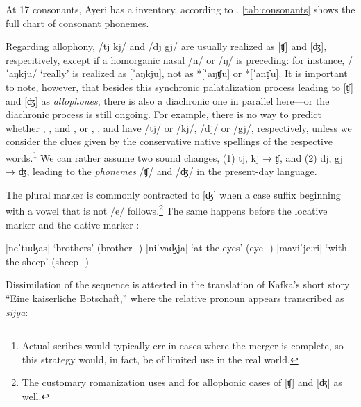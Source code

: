 At 17 consonants, Ayeri has a  inventory, according
to \citet{wals1}. \autoref{tab:consonants} shows the full chart of consonant
phonemes.

Regarding allophony, /tj kj/ and /dj gj/ are usually realized as [ʧ] and [ʤ],
respecitively, except if a homorganic nasal /n/ or /ŋ/ is preceding: for
instance,  /ˈaŋkju/ `really' is realized as [ˈaŋkju], not as
*[ˈaŋʧu] or *[ˈanʧu]. It is important to note, however, that besides this
synchronic palatalization process leading to [ʧ] and [ʤ] as
\emph{allophones}, there is also a diachronic one in parallel here---or the
diachronic process is still ongoing. For example, there is no way to predict
whether , , and , or ,
, and  have /tj/ or /kj/, /dj/
or /gj/, respectively, unless we consider the clues given by the conservative
native spellings of the respective words.\footnote{Actual scribes would
typically err in cases where the merger is complete, so this strategy would, in
fact, be of limited use in the real world.} We can rather assume two sound
changes, (1) tj, kj → ʧ, and (2) dj, gj → ʤ, leading to the \emph{phonemes}
/ʧ/ and /ʤ/ in the present-day language.

\label{pluralmorph} The plural marker
 is commonly contracted to [ʤ] when a
case suffix beginning with a vowel that is not /e/ follows.\footnote{The
customary romanization uses  and  for allophonic cases of [ʧ]
and [ʤ] as well.} The same happens before the locative marker 
and the dative marker :

\pex
	\a {}
		[neˈtuʤas] `brothers' (brother-\Pl{}-\Parg{})
	\a {}
		[niˈvaʤja] `at the eyes' (eye-\Pl{}-\Loc{})
	\a {}
		[maviˈjeːri] `with the sheep' (sheep-\Pl{}-\Ins{})
\xe

Dissimilation of the sequence  is
attested in the translation of Kafka's short story ``Eine kaiserliche
Botschaft,'' where the relative pronoun  appears transcribed
as \textit{sijya}:

